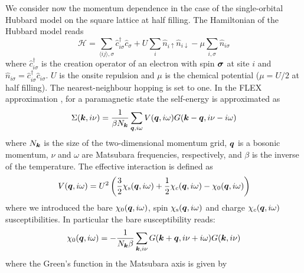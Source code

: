 We consider now the momentum dependence in the case of the single-orbital Hubbard model on the square lattice at half filling. 
The Hamiltonian of the Hubbard model reads
\begin{equation}
    \mathcal{H} = \sum_{\langle ij \rangle, \sigma} \hat{c}^\dag_{i\sigma}\hat{c}_{\sigma} + U \sum_{i} \hat{n}_{i\uparrow}\hat{n}_{i\downarrow} - \mu\sum_{i,\sigma}\hat{n}_{i\sigma}
    \label{eq:HubbardHamiltonian}
\end{equation}
where $\hat{c}^\dag_{i\sigma}$ is the creation operator of an electron with spin $\boldsymbol{\sigma}$ at site $i$ and $\hat{n}_{i\sigma}=\hat{c}^\dag_{i\sigma}\hat{c}_{i\sigma}$. $U$ is the onsite repulsion and $\mu$ is the chemical potential ($\mu=U/2$ at half filling). The nearest-neighbour hopping is set to one.
In the FLEX approximation \cite{Bickers1989}, for a paramagnetic state the self-energy is approximated as
\begin{equation}
    \Sigma(\boldsymbol{k}, i\nu) = \frac{1}{\beta N_{\boldsymbol{k}} } \sum_{\boldsymbol{q},i\omega}V(\boldsymbol{q}, i\omega) G(\boldsymbol{k} - \boldsymbol{q}, i\nu - i\omega)
\end{equation}
where $N_{\boldsymbol{k}}$ is the size of the two-dimensional momentum grid, $\boldsymbol{q}$ is a bosonic momentum, $\nu$ and $\omega$ are Matsubara frequencies, respectively, and $\beta$ is the inverse of the temperature. The effective interaction is defined as
\begin{equation}
    V(\boldsymbol{q}, i\omega) = U^2\left(\frac{3}{2} \chi_{\text{s}}(\boldsymbol{q}, i\omega) + \frac{1}{2} \chi_{c}(\boldsymbol{q}, i\omega) - \chi_{0}(\boldsymbol{q}, i\omega)\right)
\end{equation}
where we introduced the bare $\chi_{0}(\boldsymbol{q}, i\omega)$, spin $\chi_{\text{s}}(\boldsymbol{q}, i\omega)$ and charge $\chi_{c}(\boldsymbol{q}, i\omega)$ susceptibilities. In particular the bare susceptibility reads:
\begin{equation}
    \chi_{0}(\boldsymbol{q}, i\omega) = -\frac{1}{N_{\boldsymbol{k}}\beta} \sum_{\boldsymbol{k}, i\nu} G(\boldsymbol{k} + \boldsymbol{q},i\nu + i\omega)G(\boldsymbol{k}, i\nu)
    \label{eq:bareSusceptibility}
\end{equation}
where the Green's function in the Matsubara axis is given by 

